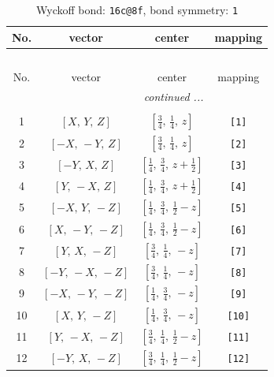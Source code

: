 \documentclass[fleqn,8pt]{jsarticle}
\begin{document}
\begin{longtable}{cccc}
\caption{Wyckoff bond: {\tt 16c@8f}, bond symmetry: {\tt 1}}
 \\
 \hline \hline
No. & vector & center & mapping \\ \hline \endfirsthead

\multicolumn{3}{l}{\tablename\ \thetable{}} \\
 \hline \hline
No. & vector & center & mapping \\ \hline \endhead

 \hline \hline
\multicolumn{3}{r}{\footnotesize\it continued ...} \\ \endfoot

 \hline \hline
\multicolumn{3}{r}{} \\ \endlastfoot

1 & $\left[ X,\, Y,\, Z \right]$ & $\left[ \frac{3}{4},\, \frac{1}{4},\, z \right]$ & {\tt [1]} \\ \hline
2 & $\left[ - X,\, - Y,\, Z \right]$ & $\left[ \frac{3}{4},\, \frac{1}{4},\, z \right]$ & {\tt [2]} \\ \hline
3 & $\left[ - Y,\, X,\, Z \right]$ & $\left[ \frac{1}{4},\, \frac{3}{4},\, z + \frac{1}{2} \right]$ & {\tt [3]} \\ \hline
4 & $\left[ Y,\, - X,\, Z \right]$ & $\left[ \frac{1}{4},\, \frac{3}{4},\, z + \frac{1}{2} \right]$ & {\tt [4]} \\ \hline
5 & $\left[ - X,\, Y,\, - Z \right]$ & $\left[ \frac{1}{4},\, \frac{3}{4},\, \frac{1}{2} - z \right]$ & {\tt [5]} \\ \hline
6 & $\left[ X,\, - Y,\, - Z \right]$ & $\left[ \frac{1}{4},\, \frac{3}{4},\, \frac{1}{2} - z \right]$ & {\tt [6]} \\ \hline
7 & $\left[ Y,\, X,\, - Z \right]$ & $\left[ \frac{3}{4},\, \frac{1}{4},\, - z \right]$ & {\tt [7]} \\ \hline
8 & $\left[ - Y,\, - X,\, - Z \right]$ & $\left[ \frac{3}{4},\, \frac{1}{4},\, - z \right]$ & {\tt [8]} \\ \hline
9 & $\left[ - X,\, - Y,\, - Z \right]$ & $\left[ \frac{1}{4},\, \frac{3}{4},\, - z \right]$ & {\tt [9]} \\ \hline
10 & $\left[ X,\, Y,\, - Z \right]$ & $\left[ \frac{1}{4},\, \frac{3}{4},\, - z \right]$ & {\tt [10]} \\ \hline
11 & $\left[ Y,\, - X,\, - Z \right]$ & $\left[ \frac{3}{4},\, \frac{1}{4},\, \frac{1}{2} - z \right]$ & {\tt [11]} \\ \hline
12 & $\left[ - Y,\, X,\, - Z \right]$ & $\left[ \frac{3}{4},\, \frac{1}{4},\, \frac{1}{2} - z \right]$ & {\tt [12]} \\ \hline

\end{longtable}
\end{document}
